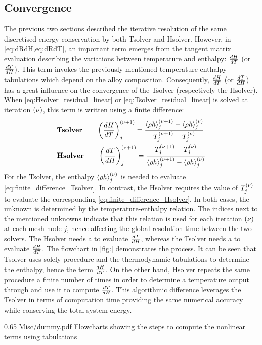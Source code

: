 \subsection{Convergence}
%
The previous two sections described the iterative resolution of the same discretised energy 
conservation by both Tsolver and Hsolver. However, in \cref{eq:dRdH,eq:dRdT}, an important 
term emerges from the tangent matrix evaluation describing the variations between temperature 
and enthalpy: $\frac{dH}{dT}$ (or $\frac{dT}{dH}$). This term invokes the previously mentioned temperature-enthalpy 
tabulations which depend on the alloy composition. Consequently,  $\frac{dH}{dT}$ (or $\frac{dT}{dH}$)
has a great influence on the convergence of the Tsolver (respectively the Hsolver). 
When \cref{eq:Hsolver_residual_linear} or \cref{eq:Tsolver_residual_linear} is solved at iteration ${\left( \nu \right)}$, this term is written using a finite difference:
\begin{align}
\label{eq:finite_difference_Tsolver}
& \textbf{Tsolver} \qquad \left( \frac{dH}{dT} \right)^{{\left( \nu+1 \right)}}_{j} = \frac{\langle  \rho h  \rangle_j^{{\left( \nu+1 \right)}} - \langle  \rho h  \rangle_j^{{\left( \nu \right)}}}{T_j^{{\left( \nu+1 \right)}} - T_j^{{\left( \nu \right)}}} \\
\label{eq:finite_difference_Hsolver}
& \textbf{Hsolver} \qquad \left( \frac{dT}{dH} \right)^{{\left( \nu+1 \right)}}_{j} = \frac{T_j^{{\left( \nu+1 \right)}} - T_j^{{\left( \nu \right)}}}{\langle  \rho h  \rangle_j^{{\left( \nu+1 \right)}} - \langle  \rho h  \rangle_j^{{\left( \nu \right)}}}
\end{align}
For the Tsolver, the enthalpy $\langle  \rho h  \rangle_j^{{\left( \nu \right)}}$ is needed to evaluate \cref{eq:finite_difference_Tsolver}. 
In contrast, the Hsolver requires the value of $T_j^{{\left( \nu \right)}}$ to evaluate the corresponding \cref{eq:finite_difference_Hsolver}.
In both cases, the unknown is determined by the temperature-enthalpy relation. The indices next to the mentioned unknowns
indicate that this relation is used for each iteration ${\left( \nu \right)}$ at each mesh node $j$, hence affecting the global resolution time 
between the two solvers. The Hsolver needs a \HtoT to evaluate $\frac{dT}{dH}$, whereas the Tsolver needs a \TtoH to evaluate $\frac{dH}{dT}$. 
The flowchart in \cref{fig:} demonstrates the process.
It can be seen that Tsolver uses solely \TtoH procedure and the thermodynamic tabulations to determine the enthalpy, 
hence the term $\frac{dH}{dT}$. On the other hand, Hsolver repeats the same procedure a finite number of times in order to 
determine a temperature output through \HtoT and use it to compute $\frac{dT}{dH}$. This algorithmic difference leverages the 
Tsolver in terms of computation time providing the same numerical accuracy while conserving the total system energy. 
%
\begin{figureth}
{0.65}
{Misc/dummy.pdf}
{Flowcharts showing the steps to compute the nonlinear terms using tabulations}
\label{fig:diagram}
\end{figureth}

